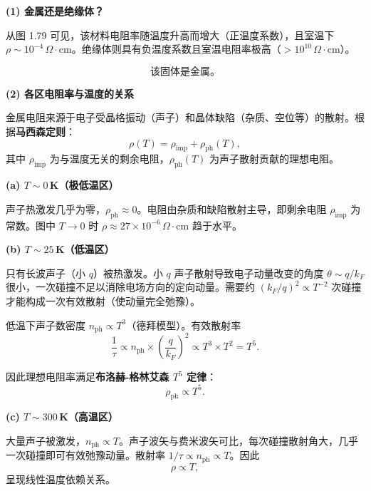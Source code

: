 \begin{derivationbox}[标准解题过程]
\textbf{(1) 金属还是绝缘体？}

从图 1.79 可见，该材料电阻率随温度升高而增大（正温度系数），且室温下 $\rho\sim10^{-4}\,\Omega\cdot\text{cm}$。绝缘体则具有负温度系数且室温电阻率极高（$>10^{10}\,\Omega\cdot\text{cm}$）。

\begin{equation}
\boxed{\text{该固体是金属。}}
\end{equation}

\textbf{(2) 各区电阻率与温度的关系}

金属电阻来源于电子受晶格振动（声子）和晶体缺陷（杂质、空位等）的散射。根据\textbf{马西森定则}：
\begin{equation}
\rho(T)=\rho_{\text{imp}}+\rho_{\text{ph}}(T),
\end{equation}
其中 $\rho_{\text{imp}}$ 为与温度无关的剩余电阻，$\rho_{\text{ph}}(T)$ 为声子散射贡献的理想电阻。

\textbf{(a) $T\sim0\,$K（极低温区）}

声子热激发几乎为零，$\rho_{\text{ph}}\approx0$。电阻由杂质和缺陷散射主导，即剩余电阻 $\rho_{\text{imp}}$ 为常数。图中 $T\to0$ 时 $\rho\approx27\times10^{-6}\,\Omega\cdot\text{cm}$ 趋于水平。

\textbf{(b) $T\sim25\,$K（低温区）}

只有长波声子（小 $q$）被热激发。小 $q$ 声子散射导致电子动量改变的角度 $\theta\sim q/k_F$ 很小，一次碰撞不足以消除电场方向的定向动量。需要约 $(k_F/q)^2\propto T^{-2}$ 次碰撞才能构成一次有效散射（使动量完全弛豫）。

低温下声子数密度 $n_{\text{ph}}\propto T^3$（德拜模型）。有效散射率
\begin{equation}
\frac{1}{\tau}\propto n_{\text{ph}}\times\left(\frac{q}{k_F}\right)^2\propto T^3\times T^2=T^5.
\end{equation}

因此理想电阻率满足\textbf{布洛赫-格林艾森 $T^5$ 定律}：
\begin{equation}
\boxed{\rho_{\text{ph}}\propto T^5.}
\end{equation}

\textbf{(c) $T\sim300\,$K（高温区）}

大量声子被激发，$n_{\text{ph}}\propto T$。声子波矢与费米波矢可比，每次碰撞散射角大，几乎一次碰撞即可有效弛豫动量。散射率 $1/\tau\propto n_{\text{ph}}\propto T$。因此
\begin{equation}
\boxed{\rho\propto T,}
\end{equation}
呈现线性温度依赖关系。


\end{derivationbox}
